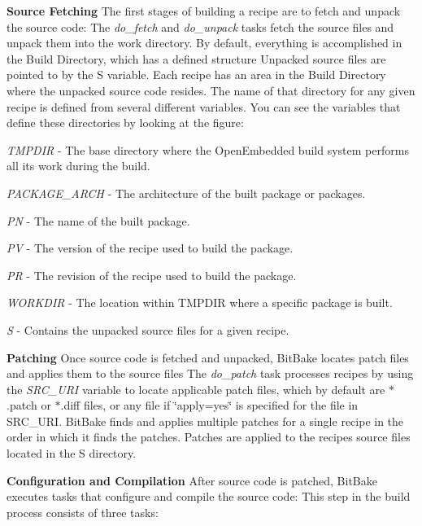\begin{DoxyItemize}
\item {\bfseries Source Fetching} The first stages of building a recipe are to fetch and unpack the source code\+:  The {\itshape do\+\_\+fetch} and {\itshape do\+\_\+unpack} tasks fetch the source files and unpack them into the work directory. By default, everything is accomplished in the Build Directory, which has a defined structure Unpacked source files are pointed to by the S variable. Each recipe has an area in the Build Directory where the unpacked source code resides. The name of that directory for any given recipe is defined from several different variables. You can see the variables that define these directories by looking at the figure\+:
\begin{DoxyItemize}
\item {\itshape T\+M\+P\+D\+IR} -\/ The base directory where the Open\+Embedded build system performs all its work during the build.
\item {\itshape P\+A\+C\+K\+A\+G\+E\+\_\+\+A\+R\+CH} -\/ The architecture of the built package or packages.
\item {\itshape PN} -\/ The name of the built package.
\item {\itshape PV} -\/ The version of the recipe used to build the package.
\item {\itshape PR} -\/ The revision of the recipe used to build the package.
\item {\itshape W\+O\+R\+K\+D\+IR} -\/ The location within T\+M\+P\+D\+IR where a specific package is built.
\item {\itshape S} -\/ Contains the unpacked source files for a given recipe.
\end{DoxyItemize}
\item {\bfseries Patching} Once source code is fetched and unpacked, Bit\+Bake locates patch files and applies them to the source files  The {\itshape do\+\_\+patch} task processes recipes by using the {\itshape S\+R\+C\+\_\+\+U\+RI} variable to locate applicable patch files, which by default are $\ast$.patch or $\ast$.diff files, or any file if \char`\"{}apply=yes\char`\"{} is specified for the file in S\+R\+C\+\_\+\+U\+RI. Bit\+Bake finds and applies multiple patches for a single recipe in the order in which it finds the patches. Patches are applied to the recipe\textquotesingle{}s source files located in the S directory.
\item {\bfseries Configuration and Compilation} After source code is patched, Bit\+Bake executes tasks that configure and compile the source code\+:  This step in the build process consists of three tasks\+:

\end{DoxyItemize}
